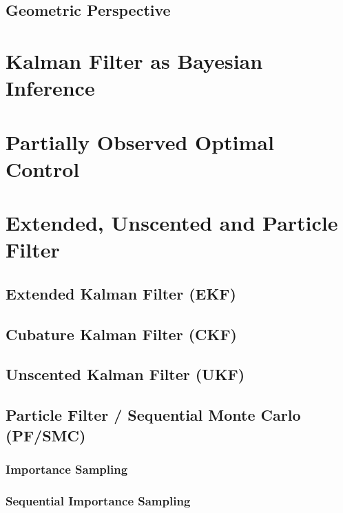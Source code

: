 		\subsection{Geometric Perspective} %

	\section{Kalman Filter as Bayesian Inference} %

	\section{Partially Observed Optimal Control} %

	\section{Extended, Unscented and Particle Filter} %

		\subsection{Extended Kalman Filter (EKF)} %

		\subsection{Cubature Kalman Filter (CKF)} %

		\subsection{Unscented Kalman Filter (UKF)} %

		\subsection{Particle Filter / Sequential Monte Carlo (PF/SMC)} %

			\subsubsection{Importance Sampling} %

			\subsubsection{Sequential Importance Sampling} %

